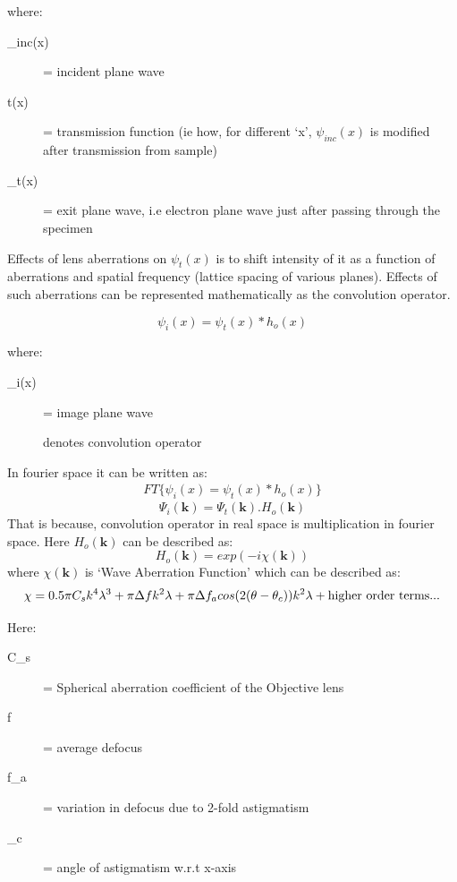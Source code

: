 where: 
\begin{description}
    \item[\psi_{inc}(x)] = incident plane wave
    \item[t(x)] = transmission function (ie how, for different `x', $\psi_{inc}(x)$ is modified after transmission from sample)
    \item[\psi_t(x)] = exit plane wave, i.e electron plane wave just after passing through the specimen
\end{description}

Effects of lens aberrations on $\psi_{t}(x)$ is to shift intensity of it as a function of aberrations and spatial frequency (lattice spacing of various planes).
Effects of such aberrations can be represented mathematically as the convolution operator.

\begin{equation}
    \psi_i(x) = \psi_t(x) \ast h_o(x)
    \label{eq:imgplnconv}
\end{equation}

where:
\begin{description}
    \item[\psi_i(x)] = image plane wave
    \item[\ast] denotes convolution operator
\end{description}  

In fourier space it can be written as:
\begin{align*}
    FT\{\psi_i(x) = \psi_t(x) \ast h_o(x)\}
\end{align*}
\begin{equation}
    \Psi_i(\boldsymbol{k}) = \Psi_t(\boldsymbol{k}) . H_o(\boldsymbol{k})
    \label{eq:fourierconv}
\end{equation}
That is because, convolution operator in real space is multiplication in fourier space.
Here $H_o(\boldsymbol{k})$ can be described as:
\begin{equation}
    H_o(\boldsymbol{k}) = exp(-i\chi(\boldsymbol{k}))
\end{equation}
where $\chi(\boldsymbol{k})$ is `Wave Aberration Function' which can be described as:
\begin{equation}
    \chi = 0.5 \pi C_s k^4 \lambda^3 + \pi \Delta f k^2 \lambda + \pi \Delta f_a cos(2(\theta - \theta_c)) k^2 \lambda + \textnormal{higher order terms}... 
\end{equation}

Here:
\begin{description}
    \item[C_s] = Spherical aberration coefficient of the Objective lens
    \item[\Delta f] = average defocus
    \item[\Delta f_a] = variation in defocus due to 2-fold astigmatism
    \item[\theta_c] = angle of astigmatism w.r.t x-axis
\end{description}


